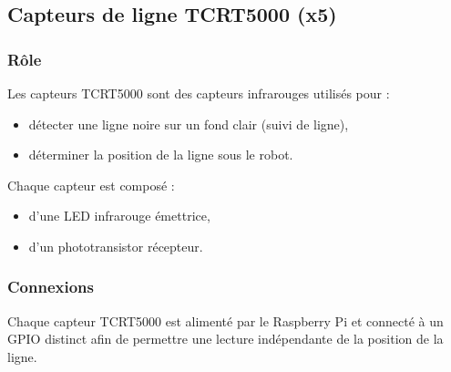 
\subsection{Capteurs de ligne TCRT5000 (x5)}

\subsubsection{Rôle}
Les capteurs TCRT5000 sont des capteurs infrarouges utilisés pour :
\begin{itemize}
    \item détecter une ligne noire sur un fond clair (suivi de ligne),
    \item déterminer la position de la ligne sous le robot.
\end{itemize}

Chaque capteur est composé :
\begin{itemize}
    \item d’une LED infrarouge émettrice,
    \item d’un phototransistor récepteur.
\end{itemize}

\subsubsection{Connexions}

Chaque capteur TCRT5000 est alimenté par le Raspberry Pi et connecté à un GPIO distinct afin de permettre une lecture indépendante de la position de la ligne.

